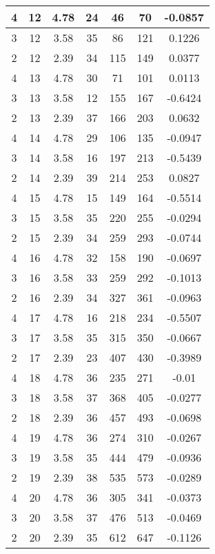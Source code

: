 \documentclass[letterpaper, 12pt]{article}
\begin{document}
\begin{longtable}{|c|c|c|c|c|c|c|}
\hline
4 & 12 & 4.78 & 24 & 46 & 70 & -0.0857 \\
\hline
3 & 12 & 3.58 & 35 & 86 & 121 & 0.1226 \\
\hline
2 & 12 & 2.39 & 34 & 115 & 149 & 0.0377 \\
\hline
4 & 13 & 4.78 & 30 & 71 & 101 & 0.0113 \\
\hline
3 & 13 & 3.58 & 12 & 155 & 167 & -0.6424 \\
\hline
2 & 13 & 2.39 & 37 & 166 & 203 & 0.0632 \\
\hline
4 & 14 & 4.78 & 29 & 106 & 135 & -0.0947 \\
\hline
3 & 14 & 3.58 & 16 & 197 & 213 & -0.5439 \\
\hline
2 & 14 & 2.39 & 39 & 214 & 253 & 0.0827 \\
\hline
4 & 15 & 4.78 & 15 & 149 & 164 & -0.5514 \\
\hline
3 & 15 & 3.58 & 35 & 220 & 255 & -0.0294 \\
\hline
2 & 15 & 2.39 & 34 & 259 & 293 & -0.0744 \\
\hline
4 & 16 & 4.78 & 32 & 158 & 190 & -0.0697 \\
\hline
3 & 16 & 3.58 & 33 & 259 & 292 & -0.1013 \\
\hline
2 & 16 & 2.39 & 34 & 327 & 361 & -0.0963 \\
\hline
4 & 17 & 4.78 & 16 & 218 & 234 & -0.5507 \\
\hline
3 & 17 & 3.58 & 35 & 315 & 350 & -0.0667 \\
\hline
2 & 17 & 2.39 & 23 & 407 & 430 & -0.3989 \\
\hline
4 & 18 & 4.78 & 36 & 235 & 271 & -0.01 \\
\hline
3 & 18 & 3.58 & 37 & 368 & 405 & -0.0277 \\
\hline
2 & 18 & 2.39 & 36 & 457 & 493 & -0.0698 \\
\hline
4 & 19 & 4.78 & 36 & 274 & 310 & -0.0267 \\
\hline
3 & 19 & 3.58 & 35 & 444 & 479 & -0.0936 \\
\hline
2 & 19 & 2.39 & 38 & 535 & 573 & -0.0289 \\
\hline
4 & 20 & 4.78 & 36 & 305 & 341 & -0.0373 \\
\hline
3 & 20 & 3.58 & 37 & 476 & 513 & -0.0469 \\
\hline
2 & 20 & 2.39 & 35 & 612 & 647 & -0.1126 \\
\hline
\end{longtable}
\end{document}

